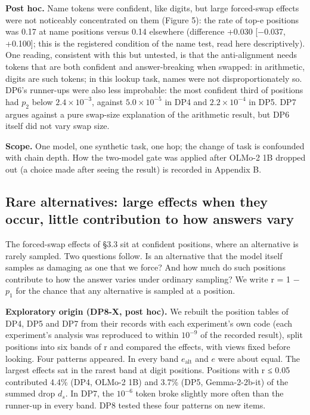 \documentclass[
  10pt,
  a4paper,
]{article}
\begin{document}
\textbf{Post hoc.} Name tokens were confident, like digits, but large forced-swap effects were not noticeably concentrated on them (Figure 5): the rate of top-e positions was 0.17 at name positions
versus 0.14 elsewhere (difference +0.030 {[}−0.037, +0.100{]}; this is the registered condition of the name test, read here descriptively). One reading, consistent with this but untested, is that the
anti-alignment needs tokens that are both confident and answer-breaking when swapped: in arithmetic, digits are such tokens; in this lookup task, names were not disproportionately so. DP6's runner-ups
were also less improbable: the most confident third of positions had \(p_2\) below \(2.4\times 10^{-3}\), against \(5.0\times 10^{-5}\) in DP4 and \(2.2\times 10^{-4}\) in DP5. DP7 argues against a
pure swap-size explanation of the arithmetic result, but DP6 itself did not vary swap size.

\textbf{Scope.} One model, one synthetic task, one hop; the change of task is confounded with chain depth. How the two-model gate was applied after OLMo-2 1B dropped out (a choice made after seeing
the result) is recorded in Appendix B.

\hypertarget{rare-alternatives-large-effects-when-they-occur-little-contribution-to-how-answers-vary}{%
\subsection{Rare alternatives: large effects when they occur, little contribution to how answers vary}\label{rare-alternatives-large-effects-when-they-occur-little-contribution-to-how-answers-vary}}

The forced-swap effects of §3.3 sit at confident positions, where an alternative is rarely sampled. Two questions follow. Is an alternative that the model itself samples as damaging as one that we
force? And how much do such positions contribute to how the answer varies under ordinary sampling? We write r = 1 − \(p_1\) for the chance that any alternative is sampled at a position.

\textbf{Exploratory origin (DP8-X, post hoc).} We rebuilt the position tables of DP4, DP5 and DP7 from their records with each experiment's own code (each experiment's analysis was reproduced to
within \(10^{-9}\) of the recorded result), split positions into six bands of r and compared the effects, with views fixed before looking. Four patterns appeared. In every band \(e_{\mathrm{alt}}\)
and \(e\) were about equal. The largest effects sat in the rarest band at digit positions. Positions with r ≤ 0.05 contributed 4.4\% (DP4, OLMo-2 1B) and 3.7\% (DP5, Gemma-2-2b-it) of the summed drop
\(d_{s}\). In DP7, the \(10^{-6}\) token broke slightly more often than the runner-up in every band. DP8 tested these four patterns on new items.
\end{document}
